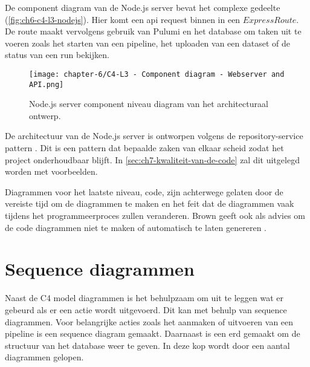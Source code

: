 De component diagram van de Node.js server bevat het complexe gedeelte (\autoref{fig:ch6-c4-l3-nodejs}). Hier komt een \acrshort{api} request binnen in een \(Express Route\). De route maakt vervolgens gebruik van Pulumi en het database om taken uit te voeren zoals het starten van een pipeline, het uploaden van een dataset of de status van een run bekijken.

\begin{figure}[hbt!]
  \centering
  \texttt{[image: chapter-6/C4-L3 - Component diagram - Webserver and API.png]}
  \caption{Node.js server component niveau diagram van het architecturaal ontwerp.}
  \label{fig:ch6-c4-l3-nodejs}
\end{figure}


De architectuur van de Node.js server is ontworpen volgens de repository-service pattern \cite{repository-service-pattern}. Dit is een pattern dat bepaalde zaken van elkaar scheid zodat het project onderhoudbaar blijft. In \autoref{sec:ch7-kwaliteit-van-de-code} zal dit uitgelegd worden met voorbeelden.

Diagrammen voor het laatste niveau, code, zijn achterwege gelaten door de vereiste tijd om de diagrammen te maken en het feit dat de diagrammen vaak tijdens het programmeerproces zullen veranderen. Brown geeft ook als advies om de code diagrammen niet te maken of automatisch te laten genereren \cite{c4-model-faq}.

\newpage

\section{Sequence diagrammen}\label{sec:ch6-sequence-diagrammen}
Naast de C4 model diagrammen is het behulpzaam om uit te leggen wat er gebeurd als er een actie wordt uitgevoerd. Dit kan met behulp van sequence diagrammen. Voor belangrijke acties zoals het aanmaken of uitvoeren van een pipeline is een sequence diagram gemaakt. Daarnaast is een \acrfull{erd} gemaakt om de structuur van het database weer te geven. In deze kop wordt door een aantal diagrammen gelopen.

